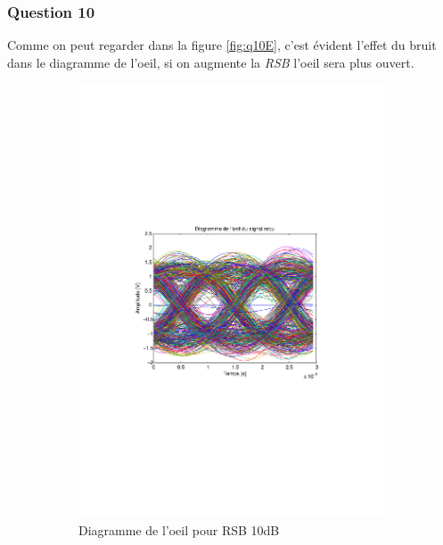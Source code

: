 \documentclass[a4paper,11pt]{article}
\begin{document}
\subsubsection*{Question 10}
Comme on peut regarder dans la figure \ref{fig:q10E}, c'est évident l'effet du bruit dans le diagramme de l'oeil, si on augmente la \emph{RSB} l'oeil sera plus ouvert.
\begin{figure}
	\begin{subfigure}{.5\textwidth}
  		\centering
  		\includegraphics[width=1\linewidth]{Q10-EbNo10.pdf}
  		\caption{Diagramme de l'oeil pour RSB 10dB}
  		\label{fig:q10E10}
	\end{subfigure}
	\begin{subfigure}{.5\textwidth}
  		\centering

\end{subfigure}
\end{figure}
\end{document}

